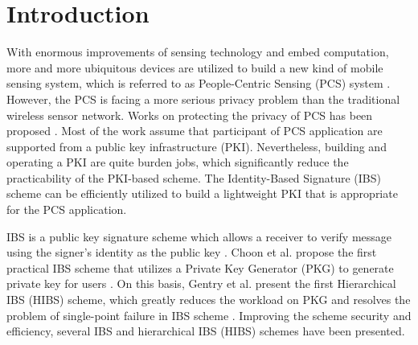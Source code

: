 \documentclass[times]{secauth}
\theoremstyle{definition}
\theoremstyle{remark}
\begin{document}
\section{Introduction} 
With enormous improvements of sensing technology and embed computation, more and more ubiquitous devices are utilized to build a new kind of mobile sensing system, which is referred to as People-Centric Sensing (PCS) system \cite{campbell2008rise}. 
However, the PCS is facing a more serious privacy problem than the traditional wireless sensor network.
Works on protecting the privacy of PCS has been proposed \cite{cornelius2008anonysense,shi2010prisense,puttaswamy2010preserving,johnson2007people}. 
Most of the work assume that participant of PCS application are supported from a public key infrastructure (PKI).
Nevertheless, building and operating a PKI are quite burden jobs, which significantly reduce the practicability of the PKI-based scheme.
The Identity-Based Signature (IBS) scheme can be efficiently utilized to build a lightweight PKI that is appropriate for the PCS application.
\par 

IBS is a public key signature scheme which allows a receiver to verify message using the signer's identity as the public key \cite{shamir1985identity}. Choon et al. propose the first practical IBS scheme that utilizes a Private Key Generator (PKG) to generate private key for users \cite{choon2002identity}.
On this basis, Gentry et al. present the first Hierarchical IBS (HIBS) scheme, which greatly reduces the workload on PKG and resolves the problem of single-point failure in IBS scheme \cite{gentry2002hierarchical}. 
Improving the scheme security and efficiency, several IBS and hierarchical IBS (HIBS) schemes \cite{boneh2001short,boneh2004short,chow2004secure,camenisch2004signature,yao2014novel,gerbush2012dual} have been presented. 
\par
\end{document}

